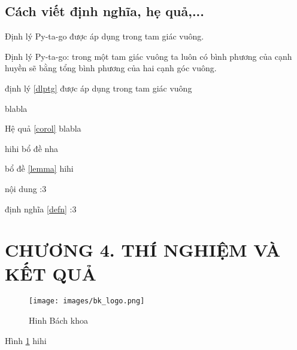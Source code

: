 \documentclass{article}
\begin{document}
\subsection{Cách viết định nghĩa, hẹ quả,...}
Định lý Py-ta-go được áp dụng trong tam giác vuông.
\begin{theorem}\label{dlptg} %
Định lý Py-ta-go: trong một tam giác vuông ta luôn có bình phương của cạnh huyền sẽ bằng tổng bình phương của hai cạnh góc vuông.
\end{theorem}
định lý \ref{dlptg} được áp dụng trong tam giác vuông

\begin{corollary}\label{corol}
blabla

\end{corollary}
Hệ quả \ref{corol} blabla

\begin{lemma}\label{lemma}
hihi bổ đề nha
\end{lemma}
bổ đề \ref{lemma} hihi

\begin{defn}\label{defn}
nội dung :3
\end{defn}
định nghĩa \ref{defn} :3
\newpage

\section*{CHƯƠNG 4. THÍ NGHIỆM VÀ KẾT QUẢ}
{}
\setcounter{section}{4}
\setcounter{subsection}{0}
\setcounter{figure}{0}
\setcounter{table}{0}
\lipsum[] 
\begin{figure}[H]
    \centering
    \texttt{[image: images/bk\_logo.png]}
    \label{Hinh41}
    \caption{Hinh Bách khoa}
\end{figure}
Hình \ref{Hinh41} hihi
\cleardoublepage
\end{document}
